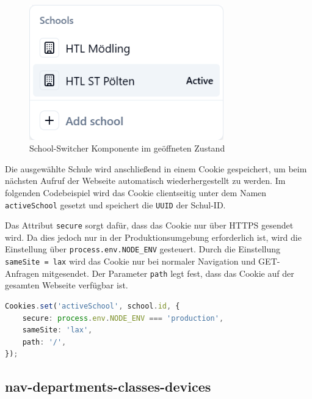 \begin{inhalt}
\begin{enumerate}[label=\textbf{\arabic*.}]
\begin{figure}[!htb]
\centering
\includegraphics[width=0.75\textwidth]{files/Thomas/pics/Website/Sidebar/school-switcher/school-switcher-open.png}
\caption[School-Switcher geöffnet]{School-Switcher Komponente im geöffneten Zustand}
\label{fig:school_switcher_open}
\end{figure}

Die ausgewählte Schule wird anschließend in einem Cookie gespeichert, um beim nächsten Aufruf der Webseite automatisch wiederhergestellt zu werden.  
Im folgenden Codebeispiel wird das Cookie clientseitig unter dem Namen \texttt{activeSchool} gesetzt und speichert die \texttt{UUID} der Schul-ID.

Das Attribut \texttt{secure} sorgt dafür, dass das Cookie nur über HTTPS gesendet wird.  
Da dies jedoch nur in der Produktionsumgebung erforderlich ist, wird die Einstellung über \texttt{process.env.NODE\_ENV} gesteuert.  
Durch die Einstellung \texttt{sameSite = lax} wird das Cookie nur bei normaler Navigation und GET-Anfragen mitgesendet.  
Der Parameter \texttt{path} legt fest, dass das Cookie auf der gesamten Webseite verfügbar ist.

\begin{lstlisting}[language=TypeScript]
Cookies.set('activeSchool', school.id, {
    secure: process.env.NODE_ENV === 'production',
    sameSite: 'lax',
    path: '/',
});
\end{lstlisting}











\subsection{nav-departments-classes-devices}



\end{enumerate}
\end{inhalt}

